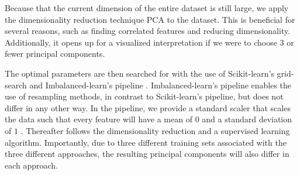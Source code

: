 

\noindent Because that the current dimension of the entire dataset is still large, we apply the dimensionality reduction technique PCA to the dataset. This is beneficial for several reasons, such as finding correlated features and reducing dimensionality. Additionally, it opens up for a visualized interpretation if we were to choose $3$ or fewer principal components.

The optimal parameters are then searched for with the use of Scikit-learn's grid-search \cite{Pedregosa2012} and Imbalanced-learn's pipeline \cite{Lemaitre2016}. Imbalanced-learn's pipeline enables the use of resampling methods, in contrast to Scikit-learn's pipeline, but does not differ in any other way. In the pipeline, we provide a standard scaler that scales the data such that every feature will have a mean of $0$ and a standard deviation of $1$ \cite{Pedregosa2012}. Thereafter follows the dimensionality reduction and a supervised learning algorithm. Importantly, due to three different training sets associated with the three different approaches, the resulting principal components will also differ in each approach.
